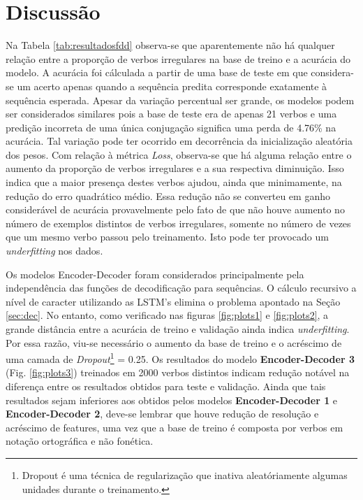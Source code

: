 \section{Discussão}
\label{sec:disc}

Na Tabela \ref{tab:resultadosfdd} observa-se que aparentemente não há qualquer relação entre a proporção de verbos irregulares na base de treino e a acurácia do modelo. A acurácia foi cálculada a partir de uma base de teste em que considera-se um acerto apenas quando a sequência predita corresponde exatamente à sequência esperada. Apesar da variação percentual ser grande, os modelos podem ser considerados similares pois a base de teste era de apenas 21 verbos e uma predição incorreta de uma única conjugação significa uma perda de 4.76\% na acurácia. Tal variação pode ter ocorrido em decorrência da inicialização aleatória dos pesos. Com relação à métrica \textit{Loss}, observa-se que há alguma relação entre o aumento da proporção de verbos irregulares e a sua respectiva diminuição. Isso indica que a maior presença destes verbos ajudou, ainda que minimamente, na redução do erro quadrático médio. Essa redução não se converteu em ganho considerável de acurácia provavelmente pelo fato de que não houve aumento no número de exemplos distintos de verbos irregulares, somente no número de vezes que um mesmo verbo passou pelo treinamento. Isto pode ter provocado um \textit{underfitting} nos dados.

Os modelos Encoder-Decoder foram considerados principalmente pela independência das funções de decodificação para sequências. O cálculo recursivo a nível de caracter utilizando as LSTM's elimina o problema apontado na Seção \ref{sec:dec}. No entanto, como verificado nas figuras \ref{fig:plots1} e \ref{fig:plots2}, a grande distância entre a acurácia de treino e validação ainda indica \textit{underfitting}. Por essa razão, viu-se necessário o aumento da base de treino e o acréscimo de uma camada de \textit{Dropout}\footnote{Dropout é uma técnica de regularização que inativa aleatóriamente algumas unidades durante o treinamento. %
} = 0.25. Os resultados do modelo \textbf{Encoder-Decoder 3} (Fig. \ref{fig:plots3}) treinados em 2000 verbos distintos indicam redução notável na diferença entre os resultados obtidos para teste e validação. Ainda que tais resultados sejam inferiores aos obtidos pelos modelos \textbf{Encoder-Decoder 1} e \textbf{Encoder-Decoder 2}, deve-se lembrar que houve redução de resolução e acréscimo de features, uma vez que a base de treino é composta por verbos em notação ortográfica e não fonética. 

